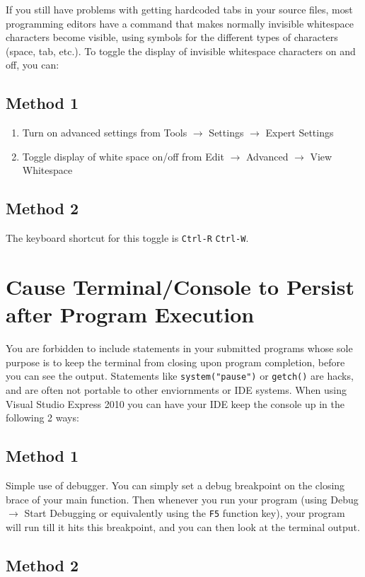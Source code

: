 \documentclass[11pt]{article}
\begin{document}
If you still have problems with getting hardcoded tabs in your source
files, most programming editors have a command that makes normally
invisible whitespace characters become visible, using symbols for the
different types of characters (space, tab, etc.).  To toggle the
display of invisible whitespace characters on and off, you can:
\subsection{Method 1}
\label{sec-3-1}

\begin{enumerate}
\item Turn on advanced settings from Tools $\rightarrow$ Settings $\rightarrow$ Expert Settings
\item Toggle display of white space on/off from Edit $\rightarrow$ Advanced $\rightarrow$ View Whitespace
\end{enumerate}
\subsection{Method 2}
\label{sec-3-2}

The keyboard shortcut for this toggle is \verb~Ctrl-R~ \verb~Ctrl-W~.
\section{Cause Terminal/Console to Persist after Program Execution}
\label{sec-4}

You are forbidden to include statements in your submitted programs
whose sole purpose is to keep the terminal from closing upon program
completion, before you can see the output.  Statements like
\verb~system("pause")~ or \verb~getch()~ are hacks, and are often not portable
to other enviornments or IDE systems.  When using Visual Studio Express 2010
you can have your IDE keep the console up in the following 2 ways:
\subsection{Method 1}
\label{sec-4-1}

Simple use of debugger.  You can simply set a debug breakpoint on the
closing brace of your main function.  Then whenever you run your
program (using Debug $\rightarrow$ Start Debugging or equivalently
using the \verb~F5~ function key), your program will run till it hits this
breakpoint, and you can then look at the terminal output.
\subsection{Method 2}
\label{sec-4-2}
\end{document}

